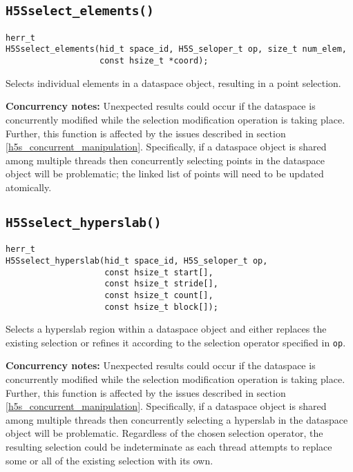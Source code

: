 \documentclass[../HDF5_RFC.tex]{subfiles}
\begin{document}
\subsection{\texttt{H5Sselect\_elements()}}
\label{apdx:h5s_func_h5sselect_elements}

\begin{verbatim}
herr_t
H5Sselect_elements(hid_t space_id, H5S_seloper_t op, size_t num_elem,
                   const hsize_t *coord);
\end{verbatim}

Selects individual elements in a dataspace object, resulting in a point selection.

\textbf{Concurrency notes:} Unexpected results could occur if the dataspace is concurrently
modified while the selection modification operation is taking place. Further, this function is
affected by the issues described in section \ref{h5s_concurrent_manipulation}. Specifically,
if a dataspace object is shared among multiple threads then concurrently selecting points in the
dataspace object will be problematic; the linked list of points will need to be updated atomically.

\subsection{\texttt{H5Sselect\_hyperslab()}}
\label{apdx:h5s_func_h5sselect_hyperslab}

\begin{verbatim}
herr_t
H5Sselect_hyperslab(hid_t space_id, H5S_seloper_t op,
                    const hsize_t start[],
                    const hsize_t stride[],
                    const hsize_t count[], 
                    const hsize_t block[]);
\end{verbatim}

Selects a hyperslab region within a dataspace object and either replaces the existing selection
or refines it according to the selection operator specified in \texttt{op}.

\textbf{Concurrency notes:} Unexpected results could occur if the dataspace is concurrently
modified while the selection modification operation is taking place. Further, this function is
affected by the issues described in section \ref{h5s_concurrent_manipulation}. Specifically,
if a dataspace object is shared among multiple threads then concurrently selecting a hyperslab in
the dataspace object will be problematic. Regardless of the chosen selection operator, the 
resulting selection could be indeterminate as each thread attempts to replace some or all of the
existing selection with its own.
\end{document}
